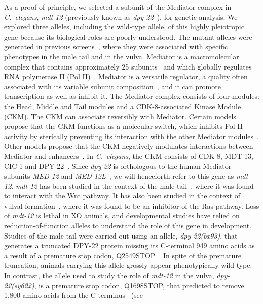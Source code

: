 \documentclass[10pt, twocolumn]{article}
\newcommand{\cel}{\emph{C.~elegans}}
\newcommand{\gene}[1]{\mbox{\emph{#1}}}
\newcommand{\protein}[1]{\mbox{\uppercase{#1}}}
\newcommand{\dpy}{\gene{mdt-12}}
\begin{document}
As a proof of principle, we selected a subunit of the Mediator complex in
\cel{}, \dpy{} (previously known as \gene{dpy-22}~\cite{Bourbon2004}), for
genetic analysis. We explored three alleles, including the wild-type allele, of
this highly pleiotropic gene because its biological roles are poorly understood.
The mutant alleles were generated in previous
screens~\cite{Zhang2000,Moghal2003}, where they were associated with specific
phenotypes in the male tail and in the vulva. Mediator is a macromolecular
complex that contains approximately 25 subunits~\cite{Jeronimo2017} and which
globally regulates RNA polymerase II (Pol II)~\cite{Allen2015,Takagi2006}.
Mediator is a versatile regulator, a quality often associated with its variable
subunit composition~\cite{Allen2015}, and it can promote transcription as well
as inhibit it. The Mediator complex consists of four modules: the Head, Middle
and Tail modules and a CDK-8-associated Kinase Module (CKM). The CKM can
associate reversibly with Mediator. Certain models propose that the CKM
functions as a molecular switch, which inhibits Pol II activity by sterically
preventing its interaction with the other Mediator
modules~\cite{Knuesel2009,Elmlund2006}. Other models propose that the CKM
negatively modulates interactions between Mediator and
enhancers~\cite{VandePeppel2005}. In \cel{}, the CKM consists of
\protein{cdk-8}, \protein{mdt-13}, \protein{cic-1} and
\protein{DPY-22}~\cite{Grants2015}. Since \gene{dpy-22} is orthologous to the
human Mediator subunits \gene{MED-12} and \gene{MED-12L}~\cite{Zhang2000}, we
will henceforth refer to this gene as \dpy{}. \dpy{} has been studied in the
context of the male tail~\cite{Zhang2000}, where it was found to interact with
the Wnt pathway. It has also been studied in the context of vulval
formation~\cite{Moghal2003a}, where it was found to be an inhibitor of the Ras
pathway. Loss of \dpy{} is lethal in XO animals\cite{Hodgkin1979,Meneely1987},
and developmental studies have relied on reduction-of-function alleles to
understand the role of this gene in development. Studies of the male tail were
carried out using an allele, \gene{dpy-22(bx93)}, that generates a truncated
\protein{dpy-22} protein missing its C-terminal 949 amino acids as a result of a
premature stop codon, Q2549STOP~\cite{Zhang2000}. In spite of the premature
truncation, animals carrying this allele grossly appear phenotypically
wild-type. In contrast, the allele used to study the role of \dpy{} in the
vulva, \gene{dpy-22(sy622)}, is a premature stop codon, Q1698STOP, that
predicted to remove 1,800 amino acids from the C-terminus~\cite{Moghal2003} (see
\end{document}
